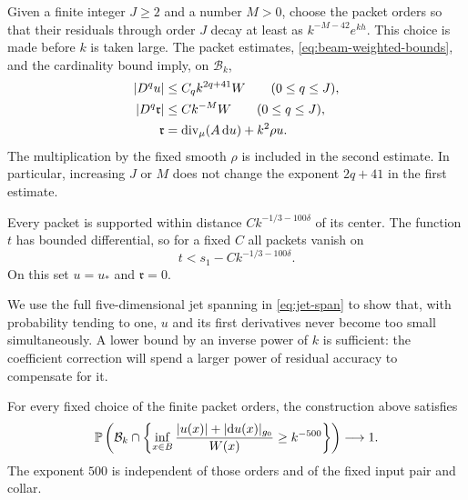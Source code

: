 Given a finite integer $J\ge2$ and a number $M>0$, choose the packet
orders so that their residuals through order $J$ decay at least as
$k^{-M-42}e^{kh}$. This choice is made before $k$ is taken large.
The packet estimates, \eqref{eq:beam-weighted-bounds}, and the
cardinality bound imply, on $\mathcal B_k$,
\begin{equation}\label{eq:sum-weighted-bounds}
 \begin{split}
 |D^qu|&\le C_q k^{2q+41}W\qquad(0\le q\le J),\\
 |D^q\mathfrak r|&\le C k^{-M}W\qquad(0\le q\le J),\\
 \mathfrak r&=\operatorname{div}_\mu(A\,\mathrm d u)+k^2\rho u .
 \end{split}
\end{equation}
The multiplication by the fixed smooth $\rho$ is included in the
second estimate. In particular, increasing $J$ or $M$ does not change
the exponent $2q+41$ in the first estimate.

Every packet is supported within distance $Ck^{-1/3-100\delta}$ of
its center. The function $t$ has bounded differential, so for a fixed
$C$ all packets vanish on
\begin{equation}\label{eq:untouched-region}
 t<s_1-Ck^{-1/3-100\delta}.
\end{equation}
On this set $u=u_*$ and $\mathfrak r=0$.

We use the full five-dimensional jet spanning in \eqref{eq:jet-span}
to show that, with probability tending to one, $u$ and its first
derivatives never become too small simultaneously. A lower bound by
an inverse power of $k$ is sufficient:
the coefficient correction will spend a larger power of residual
accuracy to compensate for it.

\begin{lemma}
\label{lem:noncancellation}
For every fixed choice of the finite packet orders, the construction
above satisfies
\begin{equation}\label{eq:noncancellation}
 \mathbb P\left(\mathcal B_k\cap\left\{
 \inf_{x\in B}\frac{|u(x)|+|\mathrm d u(x)|_{g_0}}{W(x)}
 \ge k^{-500}\right\}\right)\longrightarrow1.
\end{equation}
The exponent $500$ is independent of those orders and of the fixed
input pair and collar.
\end{lemma}

